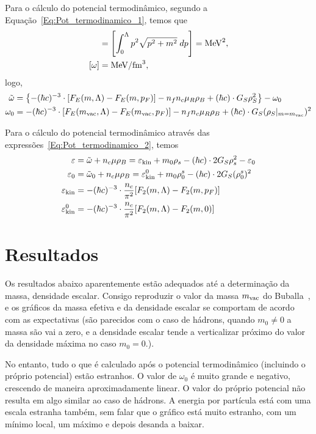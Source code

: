 Para o cálculo do potencial termodinâmico, segundo a Equação~\ref{Eq:Pot_termodinamico_1}, temos que
\begin{align}
	[F_E] &= \left[\int_0^\Lambda p^2\sqrt{p^2+m^2} \;dp\right] = \rm{MeV}^2, \\
	[\omega] &= \rm{MeV}/\rm{fm}^3,
\end{align}
%
logo,
\begin{align}
	\tilde{\omega} &= \left\{- (\hbar c)^{-3} \cdot [F_E(m, \Lambda) - F_E(m, p_F)] - n_fn_c\mu_R\rho_B + (\hbar c) \cdot G_S\rho_S^2\right\} - \omega_0 \\
	\omega_0 &= - (\hbar c)^{-3} \cdot [F_E(m_{\rm{vac}}, \Lambda) - F_E(m_{\rm{vac}}, p_F)] - n_fn_c\mu_R\rho_B + (\hbar c) \cdot G_S(\rho_S|_{m = m_{\rm{vac}}})^2
\end{align}

Para o cálculo do potencial termodinâmico através das expressões~\eqref{Eq:Pot_termodinamico_2}, temos
\begin{subequations}
\begin{align}
	\varepsilon &= \tilde{\omega} + n_c\mu\rho_B = \varepsilon_{\rm{kin}} + m_0\rho_s - (\hbar c) \cdot 2G_S\rho_s^2 - \varepsilon_0\\
	\varepsilon_0 &= \tilde{\omega}_0 + n_c\mu\rho_B = \varepsilon_{\rm{kin}}^0 + m_0\rho_0^s - (\hbar c) \cdot 2G_S(\rho_0^s)^2 \\
	\varepsilon_{\rm{kin}} &= -(\hbar c)^{-3} \cdot \frac{n_c}{\pi^2} [F_2(m, \Lambda) - F_2(m, p_F)] \\
	\varepsilon_{\rm{kin}}^0 &= -(\hbar c)^{-3} \cdot \frac{n_c}{\pi^2} [F_2(m, \Lambda) - F_2(m, 0)]
\end{align}
\end{subequations}

\section{Resultados}

Os resultados abaixo aparentemente estão adequados até a determinação da massa, densidade escalar. Consigo reproduzir o valor da massa $m_{\rm{vac}}$ do Buballa~\cite{Buballa1996}, e os gráficos da massa efetiva e da densidade escalar se comportam de acordo com as expectativas (são parecidos com o caso de hádrons, quando $m_0 \neq 0$ a massa são vai a zero, e a densidade escalar tende a verticalizar próximo do valor da densidade máxima no caso $m_0 = 0$.).

No entanto, tudo o que é calculado após o potencial termodinâmico (incluindo o próprio potencial) estão estranhos. O valor de $\omega_0$ é muito grande e negativo, crescendo de maneira aproximadamente linear. O valor do próprio potencial não resulta em algo similar ao caso de hádrons. A energia por partícula está com uma escala estranha também, sem falar que o gráfico está muito estranho, com um mínimo local, um máximo e depois desanda a baixar.

